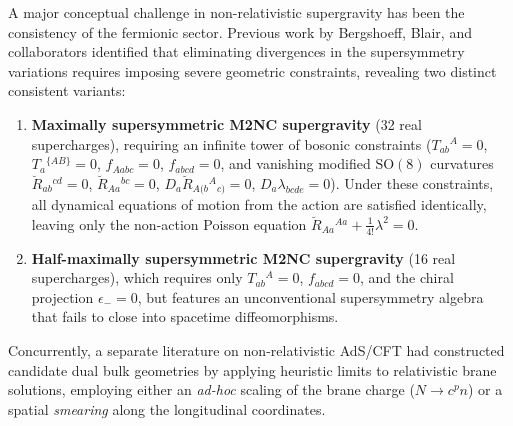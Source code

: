 \documentclass[11pt,a4paper]{article}
\begin{document}
A major conceptual challenge in non-relativistic supergravity has been the consistency of the fermionic sector. Previous work by Bergshoeff, Blair, and collaborators identified that eliminating divergences in the supersymmetry variations requires imposing severe geometric constraints, revealing two distinct consistent variants:
\begin{enumerate}
    \item \textbf{Maximally supersymmetric M2NC supergravity} (32 real supercharges), requiring an infinite tower of bosonic constraints ($T_{ab}{}^A = 0$, $T_a{}^{\{AB\}} = 0$, $f_{Aabc} = 0$, $f_{abcd} = 0$, and vanishing modified $\mathrm{SO}(8)$ curvatures $\breve{R}_{ab}{}^{cd} = 0$, $\breve{R}_{Aa}{}^{bc} = 0$, $D_a \breve{R}_{A(b}{}^A{}_{c)} = 0$, $D_a \lambda_{bcde} = 0$). Under these constraints, all dynamical equations of motion from the action are satisfied identically, leaving only the non-action Poisson equation $\breve{R}_{Aa}{}^{Aa} + \tfrac{1}{4!} \lambda^2 = 0$.
    \item \textbf{Half-maximally supersymmetric M2NC supergravity} (16 real supercharges), which requires only $T_{ab}{}^A = 0$, $f_{abcd} = 0$, and the chiral projection $\epsilon_- = 0$, but features an unconventional supersymmetry algebra that fails to close into spacetime diffeomorphisms.
\end{enumerate}

Concurrently, a separate literature on non-relativistic AdS/CFT had constructed candidate dual bulk geometries by applying heuristic limits to relativistic brane solutions, employing either an \emph{ad-hoc} scaling of the brane charge ($N \to c^p n$) or a spatial \emph{smearing} along the longitudinal coordinates. 
\end{document}
